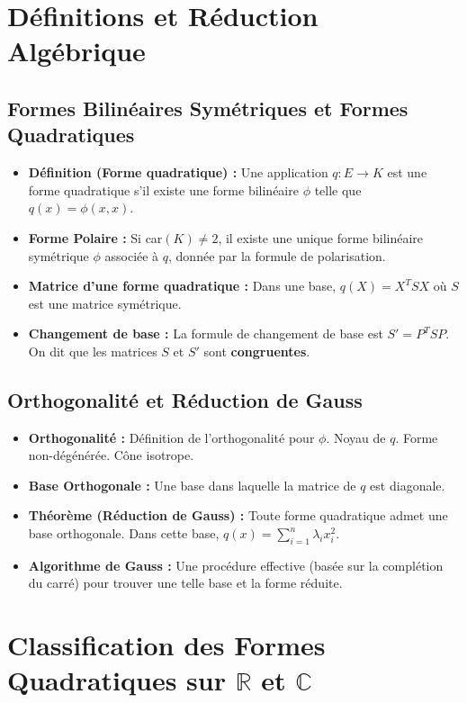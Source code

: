 \documentclass[12pt, a4paper, parskip=full]{report}
\theoremstyle{agregstyle}
\begin{document}
\section{Définitions et Réduction Algébrique}

\subsection{Formes Bilinéaires Symétriques et Formes Quadratiques}
\begin{itemize}
    \item \textbf{Définition (Forme quadratique) :} Une application $q: E \to K$ est une forme quadratique s'il existe une forme bilinéaire $\phi$ telle que $q(x)=\phi(x,x)$.
    \item \textbf{Forme Polaire :} Si car$(K) \neq 2$, il existe une unique forme bilinéaire symétrique $\phi$ associée à $q$, donnée par la formule de polarisation.
    \item \textbf{Matrice d'une forme quadratique :} Dans une base, $q(X) = X^T S X$ où $S$ est une matrice symétrique.
    \item \textbf{Changement de base :} La formule de changement de base est $S' = P^T S P$. On dit que les matrices $S$ et $S'$ sont \textbf{congruentes}.
\end{itemize}

\subsection{Orthogonalité et Réduction de Gauss}
\begin{itemize}
    \item \textbf{Orthogonalité :} Définition de l'orthogonalité pour $\phi$. Noyau de $q$. Forme non-dégénérée. Cône isotrope.
    \item \textbf{Base Orthogonale :} Une base dans laquelle la matrice de $q$ est diagonale.
    \item \textbf{Théorème (Réduction de Gauss) :} Toute forme quadratique admet une base orthogonale. Dans cette base, $q(x) = \sum_{i=1}^n \lambda_i x_i^2$.
    \item \textbf{Algorithme de Gauss :} Une procédure effective (basée sur la complétion du carré) pour trouver une telle base et la forme réduite.
\end{itemize}

\section{Classification des Formes Quadratiques sur $\mathbb{R}$ et $\mathbb{C}$}
\end{document}
